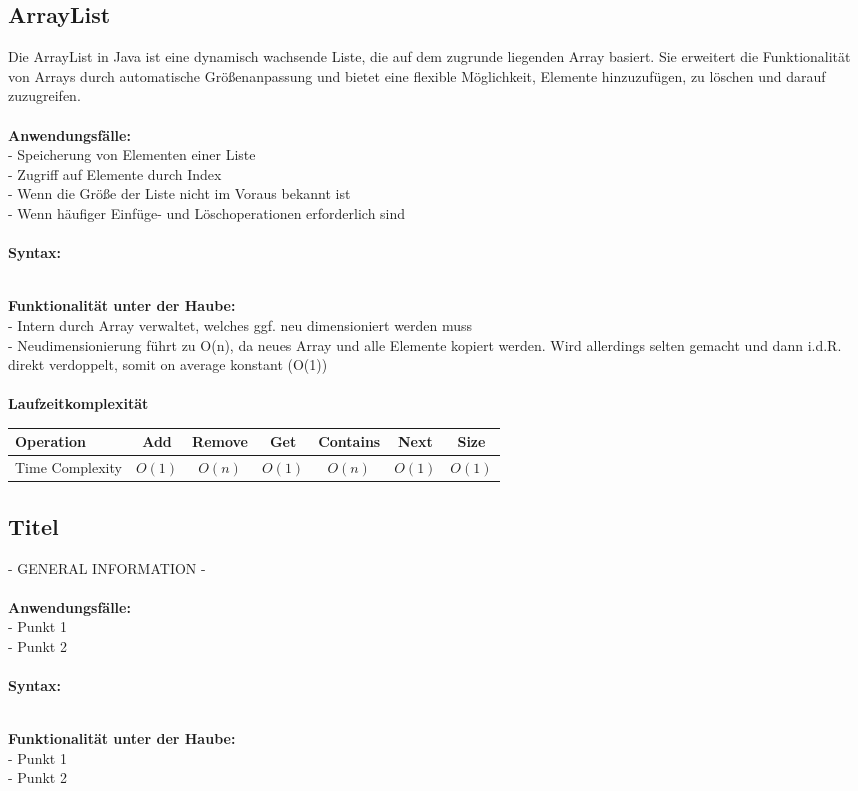 \documentclass[../main.tex]{subfiles}
\begin{document}
		\subsection{ArrayList}
		Die ArrayList in Java ist eine dynamisch wachsende Liste, die auf dem zugrunde liegenden Array basiert.
		Sie erweitert die Funktionalität von Arrays durch automatische Größenanpassung und bietet eine flexible Möglichkeit, Elemente hinzuzufügen, zu löschen und darauf zuzugreifen. \\\\
		\textbf{Anwendungsfälle:}\\
		- Speicherung von Elementen einer Liste\\
		- Zugriff auf Elemente durch Index\\
		- Wenn die Größe der Liste nicht im Voraus bekannt ist\\ 
		- Wenn häufiger Einfüge- und Löschoperationen erforderlich sind\\\\
		\textbf{Syntax:}
		 
		\\
		\textbf{Funktionalität unter der Haube:}\\
		- Intern durch Array verwaltet, welches ggf. neu dimensioniert werden muss\\
		- Neudimensionierung führt zu O(n), da neues Array und alle Elemente kopiert werden. Wird allerdings selten gemacht und dann i.d.R. direkt verdoppelt, somit on average konstant (O(1))\\\\
		\textbf{Laufzeitkomplexität}\\
		\begin{table}[ht]
			\centering
			\begin{tabular}{l *{6}{c}}
				\toprule
				Operation & Add & Remove & Get & Contains & Next & Size \\
				\midrule
				Time Complexity & $O(1)$ & $O(n)$ & $O(1)$ & $O(n)$ & $O(1)$ & $O(1)$ \\
				\bottomrule
			\end{tabular}
			\label{tab:arraylist-complexities}
		\end{table}
		\clearpage
		
		\subsection{Titel}
		- GENERAL INFORMATION -\\\\
		\textbf{Anwendungsfälle:}\\
		- Punkt 1\\
		- Punkt 2\\
		\\
		\textbf{Syntax:}
		 
		\\
		\textbf{Funktionalität unter der Haube:}\\
		- Punkt 1\\
		- Punkt 2\\\\
		
		
		\clearpage
\end{document}
